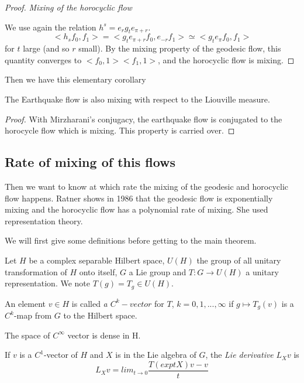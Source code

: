 \begin{proof}
\emph{Mixing of the horocyclic flow}

We use again the relation $h^s = e_r g_t e_{\pi + r}$. \[
<h_s f_0 , f_1 > = < g_t  e_{\pi+r} f_0, e_{-r} f_1> \simeq <g_t e_{\pi} f_0, f_1>
\]
for $t$ large (and so $r$ small). By the mixing property of the geodesic flow, this quantity converges to $<f_0,1><f_1,1>$, and the horocyclic flow is mixing.

\end{proof}


Then we have this elementary corollary

\begin{cor}
The Earthquake flow is also mixing with respect to the Liouville measure.
\end{cor}

\begin{proof}
With Mirzharani's conjugacy, the earthquake flow is conjugated to the horocycle flow which is mixing. This property is carried over.
\end{proof}

\subsection{Rate of mixing of this flows}

Then we want to know at which rate the mixing of the geodesic and horocyclic flow happens. Ratner shows in 1986 \cite{ratner_1987} that the geodesic flow is exponentially mixing and the horocyclic flow has a polynomial rate of mixing. She used representation theory.

We will first give some definitions before getting to the main theorem.

\begin{dfnt}
Let $H$ be a  complex separable Hilbert space, $U(H)$ the group of all unitary transformation of $H$ onto itself, $G$ a Lie group and $T: G \to U(H)$ a unitary representation. We note $T(g)=T_g \in U(H)$.

An element $v \in H$ is called \emph{a $C^k-vector$} for $T$, $k=0,1,...,\infty$ if $g \mapsto T_g(v)$ is a $C^k$-map from $G$ to the Hilbert space.
\end{dfnt}

\begin{rmq}
The space of $C^{\infty}$ vector is dense in H.
\end{rmq}

\begin{dfnt}
If $v$ is a $C^1$-vector of $H$ and $X$ is in the Lie algebra of $G$, the \emph{Lie derivative} $L_X v$ is \[
L_X v =lim_{t \to 0} \frac{T(exp tX)v-v}{t}
\]
\end{dfnt}

